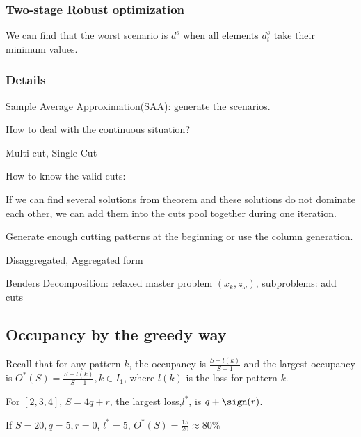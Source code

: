 \subsubsection{Two-stage Robust optimization}

We can find that the worst scenario is $d^{s}$ when all elements $d_i^{s}$ take their minimum values. 


\subsubsection{Details}

Sample Average Approximation(SAA): generate the scenarios.

How to deal with the continuous situation?

Multi-cut, Single-Cut

How to know the valid cuts:

If we can find several solutions from theorem  and these solutions do not dominate each other, we can add them into the cuts pool together during one iteration.

Generate enough cutting patterns at the beginning or use the column generation.

Disaggregated, Aggregated form

Benders Decomposition: relaxed master problem $(x_k,z_\omega)$, subproblems: add cuts

\subsection{Occupancy by the greedy way}

Recall that for any pattern $k$, the occupancy is $\frac{S-l(k)}{S-1}$ and the largest occupancy is $O^{*}(S) = \frac{S-l(k)}{S-1}, k \in I_1$, where $l(k)$ is the loss for pattern $k$.

For $[2,3,4]$, $S = 4q + r$, the largest loss,$l^{*}$, is $q+ \sign(r)$.

If $S =20, q = 5, r=0$, $l^{*} = 5$, $O^{*}(S) = \frac{15}{20} \approx 80\%$

